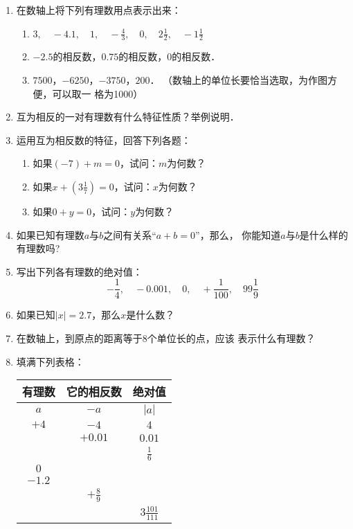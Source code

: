 \begin{enumerate}
\item 在数轴上将下列有理数用点表示出来：
\begin{enumerate}
    \item $3,\quad -4.1,\quad 1,\quad -\frac{4}{3},\quad 0,\quad 2\frac{1}{2},\quad -1\frac{1}{2}$
    \item $-2.5$的相反数，$0.75$的相反数，0的相反数．
    \item $7500$，$-6250$，$-3750$，$200$．
    （数轴上的单位长要恰当选取，为作图方便，可以取一
格为1000）
\end{enumerate}


\item 互为相反的一对有理数有什么特征性质？举例说明．
\item 运用互为相反数的特征，回答下列各题：
\begin{enumerate}
    \item 如果$(-7) +m=0$，试问：$m$为何数？
    \item 如果$x+\left(3\frac{1}{7}\right)=0$，试问：$x$为何数？
    \item 如果$0+y=0$，试问：$y$为何数？
\end{enumerate}


\item 如果已知有理数$a$与$b$之间有关系“$a+b=0$”，那么，
你能知道$a$与$b$是什么样的有理数吗?
\item 写出下列各有理数的绝对值：
\[-\frac{1}{4},\quad -0.001,\quad 0,\quad +\frac{1}{100},\quad 99\frac{1}{9}\]

\item 如果已知$|x|= 2.7$，那么$x$是什么数？
\item 在数轴上，到原点的距离等于8个单位长的点，应该
表示什么有理数？
\item 填满下列表格：
\begin{center}
    \begin{tabular}{ccc}
\hline
有理数&它的相反数&绝对值\\
\hline
$a$  &   $-a$   &   $|a|$\\ 
$+4$  &   $-4$   &   $4$\\ 
  &   $+0.01$   &   $0.01$\\ 
  &      &   $\frac{1}{6}$\\ 
$0$  &      &   \\ 
$-1.2$  &      &   \\ 
  &   $+\frac{8}{9}$   &   \\ 
  &      &   $3\frac{101}{111}$\\ 
\hline
    \end{tabular}
\end{center}


\end{enumerate}
